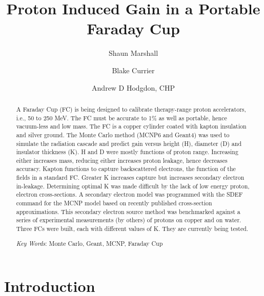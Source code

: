 \documentclass{mc2015}
\begin{document}
\title{Proton Induced Gain in a Portable Faraday Cup}

\author{Shaun Marshall}
\author{Blake Currier}

\author{Andrew D Hodgdon, CHP}

\maketitle

\begin{abstract}
A Faraday Cup (FC) is being designed to calibrate therapy-range proton accelerators, i.e., 50 to 250 MeV. The FC must be accurate to 1\% as well as portable, hence vacuum-less and low mass. The FC is a copper cylinder coated with kapton insulation and silver ground. The Monte Carlo method (MCNP6 and Geant4) was used to simulate the radiation cascade and predict gain versus height (H), diameter (D) and insulator thickness (K). H and D were mostly functions of proton range. Increasing either increases mass, reducing either increases proton leakage, hence decreases accuracy. Kapton functions to capture backscattered electrons, the function of the fields in a standard FC. Greater K increases capture but increases secondary electron in-leakage. Determining optimal K was made difficult by the lack of low energy proton, electron cross-sections. A secondary electron model was programmed with the SDEF command for the MCNP model based on recently published cross-section approximations. This secondary electron source method was benchmarked against a series of experimental measurements (by others) of protons on copper and on water. Three FCs were built, each with different values of K. They are currently being tested. 

\emph{Key Words}: Monte Carlo, Geant, MCNP, Faraday Cup
\end{abstract}

\section{Introduction}

\lipsum[2-4]
\end{document}
